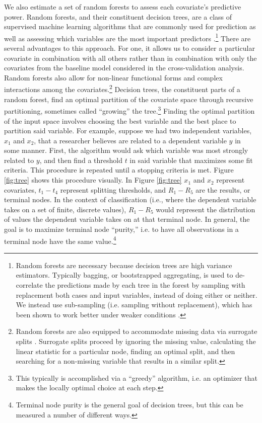 \documentclass[12pt]{article}
\begin{document}
We also estimate a set of random forests to assess each covariate's predictive power. Random forests, and their constituent decision trees, are a class of supervised machine learning algorithms that are commonly used for prediction as well as assessing which variables are the most important predictors  \citep[pp. 543-551]{murphy2012machine}.\footnote{Random forests are necessary because decision trees are high variance estimators. Typically bagging, or bootstrapped aggregating, is used to de-correlate the predictions made by each tree in the forest by sampling with replacement both cases and input variables, instead of doing either or neither. We instead use sub-sampling (i.e. sampling without replacement), which has been shown to work better under weaker conditions \citep{politis-sub}.} There are several advantages to this approach. For one, it allows us to consider a particular covariate in combination with all others rather than in combination with only the covariates from the baseline model considered in the cross-validation analysis. Random forests also allow for non-linear functional forms and complex interactions among the covariates.\footnote{Random forests are also equipped to accommodate missing data via surrogate splits \citep{hothorn2006unbiased}. Surrogate splits proceed by ignoring the missing value, calculating the linear statistic for a particular node, finding an optimal split, and then searching for a non-missing variable that results in a similar split.} Decision trees, the constituent parts of a random forest, find an optimal partition of the covariate space through recursive partitioning, sometimes called ``growing'' the tree.\footnote{This typically is accomplished via a ``greedy'' algorithm, i.e. an optimizer that makes the locally optimal choice at each step.} Finding the optimal partition of the input space involves choosing the best variable and the best place to partition said variable. For example, suppose we had two independent variables, $x_1$ and $x_2$, that a researcher believes are related to a dependent variable $y$ in some manner. First, the algorithm would ask which variable was most strongly related to $y$, and then find a threshold $t$ in said variable that maximizes some fit criteria. This procedure is repeated until a stopping criteria is met. Figure \ref{fig:tree} shows this procedure visually. In Figure \ref{fig:tree} $x_1$ and $x_2$ represent covariates, $t_1-t_4$ represent splitting thresholds, and $R_1-R_5$ are the results, or terminal nodes. In the context of classification (i.e., where the dependent variable takes on a set of finite, discrete values), $R_1-R_5$ would represent the distribution of values the dependent variable takes on at that terminal node. In general, the goal is to maximize terminal node ``purity,'' i.e. to have all observations in a terminal node have the same value.\footnote{Terminal node purity is the general goal of decision trees, but this can be measured a number of different ways.} 
\end{document}
